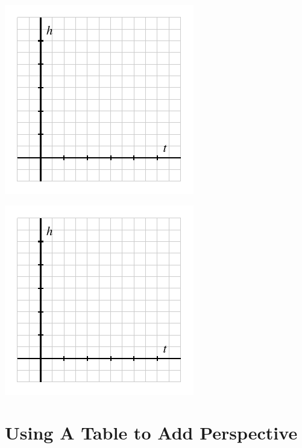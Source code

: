 \documentclass{ximera}
\begin{document}
\begin{exploration}
\begin{enumerate}[label=\alph*.]
\begin{image}
\includegraphics{tandem-h-t-blank-axes}
\end{image}


\begin{image}
\includegraphics{tandem-h-t-blank-axes}
\end{image}

\end{enumerate}
\end{exploration}




\section{Using A Table to Add Perspective}
\end{document}
